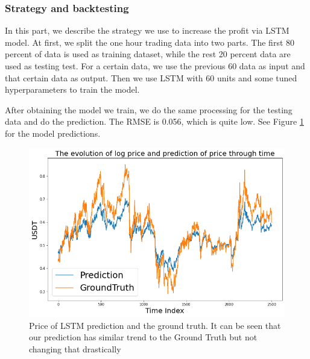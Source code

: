 \documentclass[twoside]{report}
\begin{document}
\begin{spacing}{1}
\subsubsection{Strategy and backtesting}
In this part, we describe the strategy we use to increase the profit via LSTM model. At first, we split the one hour trading data into two parts. The first 80 percent of data is used as training dataset, while the rest 20 percent data are used as testing test. For a certain data, we use the previous 60 data as input and that certain data as output. Then we use LSTM with 60 units and some tuned hyperparameters to train the model.

After obtaining the model we train, we do the same processing for the testing data and do the prediction. The RMSE is 0.056, which is quite low. See Figure \ref{fig:LSTM price} for the model predictions.


\begin{figure}[!htbp]
    \centering
    \includegraphics[scale = 0.5]{Images/LSTM price.png}
    \caption{Price of LSTM prediction and the ground truth. It can be seen that our prediction has similar trend to the Ground Truth but not changing that drastically}
    \label{fig:LSTM price}
\end{figure}





\end{spacing}
\end{document}
